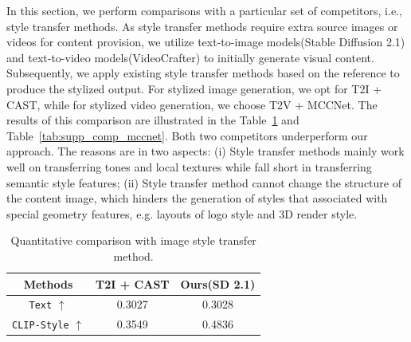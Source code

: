 In this section, we perform comparisons with a particular set of competitors, i.e., style transfer methods. As style transfer methods require extra source images or videos for content provision, we utilize text-to-image models(Stable Diffusion 2.1) and text-to-video models(VideoCrafter) to initially generate visual content. Subsequently, we apply existing style transfer methods based on the reference to produce the stylized output. For stylized image generation, we opt for T2I + CAST\cite{zhang2022domain}, while for stylized video generation, we choose T2V + MCCNet\cite{deng2021arbitrary}. The results of this comparison are illustrated in the Table~\ref{tab:supp_comp_cast} and Table~\ref{tab:supp_comp_mccnet}. 
Both two competitors underperform our approach.
The reasons are in two aspects: (i) Style transfer methods mainly work well on transferring tones and local textures while fall short in transferring semantic style features; (ii) Style transfer method cannot change the structure of the content image, which hinders the generation of styles that associated with special geometry features, e.g. layouts of logo style and 3D render style.

\begin{table}[!h]
\centering
\caption{Quantitative comparison with image style transfer method.}
\vspace{-1em}
\label{tab:supp_comp_cast}
  \begin{tabular}{ccc} %
    \hline
    Methods & T2I + CAST & Ours(SD 2.1) \\
    \hline
    \texttt{Text} $\uparrow$ & 0.3027 & 0.3028 \\
    \texttt{CLIP-Style} $\uparrow$ & 0.3549 & 0.4836 \\
    \hline
  \end{tabular}
\end{table}

